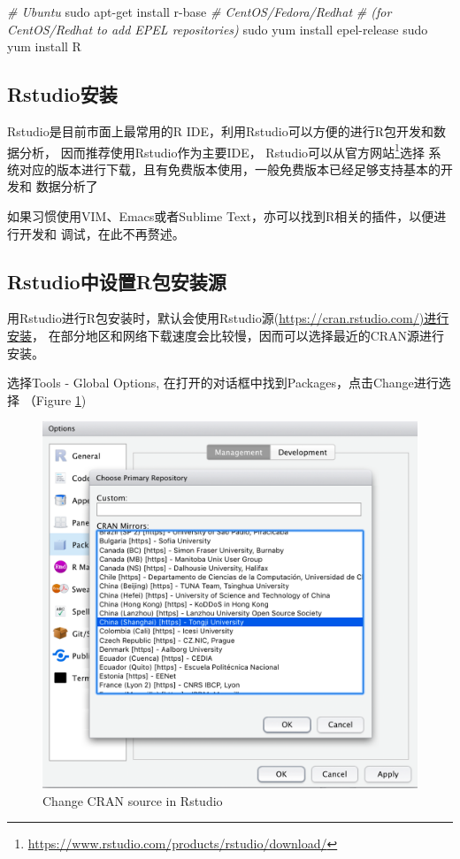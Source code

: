 \documentclass[]{ctexbook}
\newenvironment{Shaded}{\begin{snugshade}}{\end{snugshade}}
\newcommand{\CommentTok}[1]{\textcolor[rgb]{0.56,0.35,0.01}{\textit{#1}}}
\newcommand{\FunctionTok}[1]{\textcolor[rgb]{0.00,0.00,0.00}{#1}}
\newcommand{\NormalTok}[1]{#1}
\renewcommand{\href}[2]{#2\footnote{\url{#1}}}
\begin{document}
\begin{Shaded}
\begin{Highlighting}[]
\CommentTok{# Ubuntu}
\FunctionTok{sudo}\NormalTok{ apt-get install r-base}
\CommentTok{# CentOS/Fedora/Redhat}
\CommentTok{# (for CentOS/Redhat to add EPEL repositories)}
\FunctionTok{sudo}\NormalTok{ yum install epel-release }
\FunctionTok{sudo}\NormalTok{ yum install R}
\end{Highlighting}
\end{Shaded}

\hypertarget{rstudio}{%
\subsection{Rstudio安装}\label{rstudio}}

Rstudio是目前市面上最常用的R IDE，利用Rstudio可以方便的进行R包开发和数据分析，
因而推荐使用Rstudio作为主要IDE，
Rstudio可以从\href{https://www.rstudio.com/products/rstudio/download/}{官方网站}选择
系统对应的版本进行下载，且有免费版本使用，一般免费版本已经足够支持基本的开发和
数据分析了

如果习惯使用VIM、Emacs或者Sublime Text，亦可以找到R相关的插件，以便进行开发和
调试，在此不再赘述。

\hypertarget{rstudior}{%
\subsection{Rstudio中设置R包安装源}\label{rstudior}}

用Rstudio进行R包安装时，默认会使用Rstudio源(\url{https://cran.rstudio.com/)进行安装}，
在部分地区和网络下载速度会比较慢，因而可以选择最近的CRAN源进行安装。

选择Tools - Global Options, 在打开的对话框中找到Packages，点击Change进行选择
（Figure \ref{fig:Rstudio})

\begin{figure}
\includegraphics[width=0.7\linewidth]{Figures/Fig2.1} \caption{Change CRAN source in Rstudio}\label{fig:Rstudio}
\end{figure}
\end{document}

